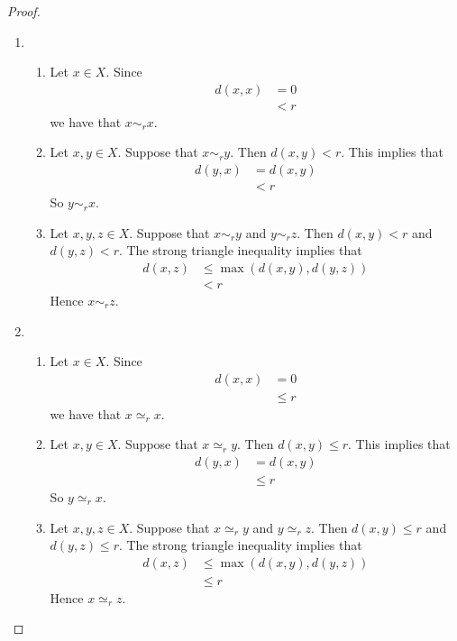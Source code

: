 \documentclass{book}
\begin{document}
\begin{proof}\
	\begin{enumerate}
		\item 
		\begin{enumerate}
			\item  Let $x \in X$. Since 
			\begin{align*}
				d(x,x) 
				& = 0 \\
				& < r
			\end{align*}
			we have that $x \sim_r x$. 
			\item Let $x,y \in X$. Suppose that $x \sim_r y$. Then $d(x,y) < r$. This implies that
			\begin{align*}
				d(y,x) 
				& = d(x,y) \\
				& < r
			\end{align*}
			So $y \sim_r x$.
			\item Let $x,y,z \in X$. Suppose that $x \sim_r y$ and $y \sim_r z$. Then $d(x,y) < r$ and $d(y,z) < r$. The strong triangle inequality implies that
			\begin{align*}
				d(x,z) 
				& \leq \max(d(x,y), d(y,z)) \\
				& < r
			\end{align*}
			Hence $x \sim_r z$.
		\end{enumerate}
		\item 
		\begin{enumerate}
			\item  Let $x \in X$. Since 
			\begin{align*}
				d(x,x) 
				& = 0 \\
				& \leq r
			\end{align*}
			we have that $x \simeq_r x$. 
			\item Let $x,y \in X$. Suppose that $x \simeq_r y$. Then $d(x,y) \leq r$. This implies that
			\begin{align*}
				d(y,x) 
				& = d(x,y) \\
				& \leq r
			\end{align*}
			So $y \simeq_r x$.
			\item Let $x,y,z \in X$. Suppose that $x \simeq_r y$ and $y \simeq_r z$. Then $d(x,y) \leq r$ and $d(y,z) \leq r$. The strong triangle inequality implies that
			\begin{align*}
				d(x,z) 
				& \leq \max(d(x,y), d(y,z)) \\
				& \leq r
			\end{align*}
			Hence $x \simeq_r z$.
		\end{enumerate}
	\end{enumerate}
\end{proof}
\end{document}
